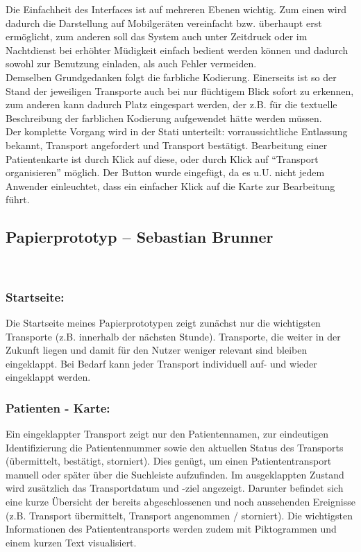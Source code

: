 \documentclass[a4paper, ngerman, 12pt]{scrartcl}
\begin{document}
Die Einfachheit des Interfaces ist auf mehreren Ebenen wichtig. Zum einen wird dadurch die Darstellung auf Mobilgeräten vereinfacht bzw. überhaupt erst ermöglicht, zum anderen soll das System auch unter Zeitdruck oder im Nachtdienst bei erhöhter Müdigkeit einfach bedient werden können und dadurch sowohl zur Benutzung einladen, als auch Fehler vermeiden.\\

Demselben Grundgedanken folgt die farbliche Kodierung. Einerseits ist so der Stand der jeweiligen Transporte auch bei nur flüchtigem Blick sofort zu erkennen, zum anderen kann dadurch Platz eingespart werden, der z.B. für die textuelle Beschreibung der farblichen Kodierung aufgewendet hätte werden müssen.\\
 
Der komplette Vorgang wird in der Stati unterteilt: vorraussichtliche Entlassung bekannt, Transport angefordert und Transport bestätigt. Bearbeitung einer Patientenkarte ist durch Klick auf diese, oder durch Klick auf “Transport organisieren” möglich. Der Button wurde eingefügt, da es u.U. nicht jedem Anwender einleuchtet, dass ein einfacher Klick auf die Karte zur Bearbeitung führt.

\subsection{Papierprototyp – Sebastian Brunner}
\begin{minipage}{\textwidth}
	\centering
	
	\label{img:brunner}
\end{minipage}\\[0.5em]
\subsubsection*{Startseite:}
Die Startseite meines Papierprototypen zeigt zunächst nur die wichtigsten Transporte (z.B. innerhalb der nächsten Stunde). Transporte, die weiter in der Zukunft liegen und damit für den Nutzer weniger relevant sind bleiben eingeklappt. Bei Bedarf kann jeder Transport individuell auf- und wieder eingeklappt werden.
\subsubsection*{Patienten - Karte:}
Ein eingeklappter Transport zeigt nur den Patientennamen, zur eindeutigen Identifizierung die Patientennummer sowie den aktuellen Status des Transports (übermittelt, bestätigt, storniert). Dies genügt, um einen Patiententransport manuell oder später über die Suchleiste aufzufinden. Im ausgeklappten Zustand wird zusätzlich das Transportdatum und -ziel angezeigt. Darunter befindet sich eine kurze Übersicht der bereits abgeschlossenen und noch aussehenden Ereignisse (z.B. Transport übermittelt, Transport angenommen / storniert). Die wichtigsten Informationen des Patiententransports werden zudem mit Piktogrammen und einem kurzen Text visualisiert.
\end{document}
